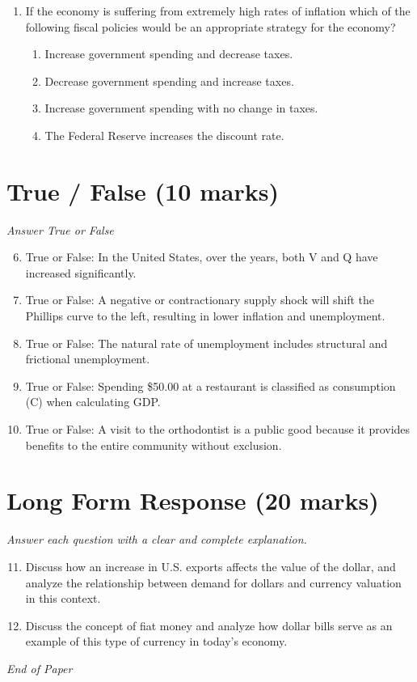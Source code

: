 \documentclass[12pt]{article}
\begin{document}
\begin{enumerate}[label=\arabic*.]
\begin{enumerate}[label=(\alph*)]
    \item of inefficiencies in the economy.
    \item of opportunity cost.
    \item of the law of increasing costs.
    \item of constant opportunity costs.
\end{enumerate}
\item If the economy is suffering from extremely high rates of inflation which of the following
fiscal policies would be an appropriate strategy for the economy?
\begin{enumerate}[label=(\alph*)]
    \item Increase government spending and decrease taxes.
    \item Decrease government spending and increase taxes.
    \item Increase government spending with no change in taxes.
    \item The Federal Reserve increases the discount rate.
\end{enumerate}
\end{enumerate}

\section*{True / False (10 marks)}
\textit{Answer True or False}
\begin{enumerate}[label=\arabic*.]
\setcounter{enumi}{5}
\item True or False: In the United States, over the years, both V and Q have increased significantly.
\item True or False: A negative or contractionary supply shock will shift the Phillips curve to the left, resulting in lower inflation and unemployment.
\item True or False: The natural rate of unemployment includes structural and frictional unemployment.
\item True or False: Spending \$50.00 at a restaurant is classified as consumption (C) when calculating GDP.
\item True or False: A visit to the orthodontist is a public good because it provides benefits to the entire community without exclusion.
\end{enumerate}

\section*{Long Form Response (20 marks)}
\textit{Answer each question with a clear and complete explanation.}
\begin{enumerate}[label=\arabic*.]
\setcounter{enumi}{10}
\item Discuss how an increase in U.S. exports affects the value of the dollar, and analyze the
relationship between demand for dollars and currency valuation in this context.
\item Discuss the concept of fiat money and analyze how dollar bills serve as an example of this
type of currency in today's economy.
\end{enumerate}

\vfill
\noindent\textit{End of Paper}
\end{document}
